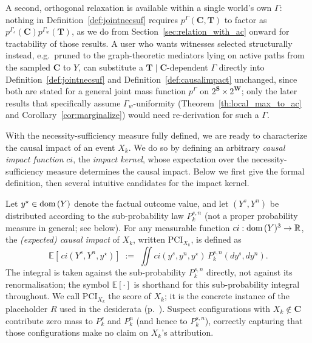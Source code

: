 A second, orthogonal relaxation is available within a single world's own $\Gamma$:
nothing in Definition~\ref{def:jointnecsuf} requires $p^\Gamma(\mathbf{C},\mathbf{T})$
to factor as $p^{\Gamma_s}(\mathbf{C})p^{\Gamma_w}(\mathbf{T})$, as we do from
Section~\ref{sec:relation_with_ac} onward for tractability of those results. A user who
wants witnesses selected structurally instead, e.g.\ pruned to the graph-theoretic
mediators lying on active paths from the sampled $\mathbf{C}$ to $Y$, can substitute a
$\mathbf{T}\mid\mathbf{C}$-dependent $\Gamma$ directly into
Definition~\ref{def:jointnecsuf} and Definition~\ref{def:causalimpact} unchanged, since
both are stated for a general joint mass function $p^\Gamma$ on
$2^{\mathbf{S}}\times2^{\mathbf{W}}$; only the later results that specifically assume
$\Gamma_w$-uniformity (Theorem~\ref{th:local_max_to_ac} and
Corollary~\ref{cor:marginalize}) would need re-derivation for such a $\Gamma$.

With the necessity-sufficiency measure fully defined, we are ready to characterize the causal impact of an event $X_k$. We do so by defining an arbitrary \emph{causal impact function} $ci$, the \emph{impact kernel}, whose expectation over the necessity-sufficiency measure determines the causal impact. Below we first give the formal definition, then several intuitive candidates for the impact kernel.

\begin{definition}  \label{def:causalimpact}
Let $y^\star\in\operatorname{dom}\,(Y)$ denote the factual outcome value, and let $(Y^s,Y^n)$ be
distributed according to the sub-probability law $P_k^{s,n}$ (not a proper
probability measure in general; see below).
For any measurable function $ci: \operatorname{dom}\,(Y)^3\to\mathbb{R}$, the
\emph{(expected) causal impact} of $X_k$, written $\mathrm{PCI}_{X_k}$, is defined as
\begin{equation}\label{eq:causal-impact}
\mathbb{E}\!\left[\,ci\!\left(Y^s,Y^n,y^\star\right)\right]
\;:=\;
\iint
ci(y^s,y^n,y^\star)\,
P_k^{s,n}(d y^s, d y^n).
\end{equation}
The integral is taken against the sub-probability $P_k^{s,n}$ directly, not against
its renormalisation; the symbol $\mathbb{E}[\cdot]$ is shorthand for this
sub-probability integral throughout. We call $\mathrm{PCI}_{X_k}$ the \ourapproach score
of $X_k$; it is the concrete instance of the placeholder $R$ used in the desiderata
(p.~\pageref{desid}). Suspect configurations with
$X_k\notin\mathbf{C}$ contribute zero mass to $P_k^s$ and $P_k^n$ (and hence to
$P_k^{s,n}$), correctly capturing that those configurations make no claim on $X_k$'s
attribution.
\end{definition}

